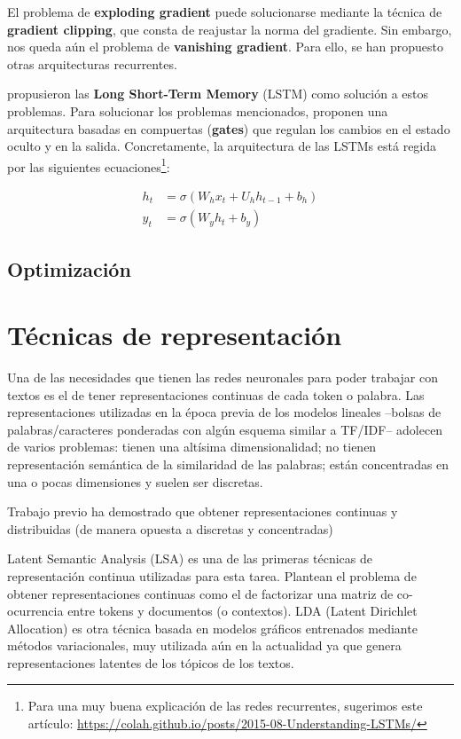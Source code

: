 El problema de \textbf{exploding gradient} puede solucionarse mediante la técnica de \textbf{gradient clipping}, que consta de reajustar la norma del gradiente. Sin embargo, nos queda aún el problema de \textbf{vanishing gradient}. Para ello, se han propuesto otras arquitecturas recurrentes.

\citet{hochreiter1997long} propusieron las \textbf{Long Short-Term Memory} (LSTM) como solución a estos problemas. Para solucionar los problemas mencionados, proponen una arquitectura basadas en compuertas (\textbf{gates}) que regulan los cambios en el estado oculto y en la salida. Concretamente, la arquitectura de las LSTMs está regida por las siguientes ecuaciones\footnote{Para una muy buena explicación de las redes recurrentes, sugerimos este artículo: \url{https://colah.github.io/posts/2015-08-Understanding-LSTMs/}}:


\begin{align}
    h_t &= \sigma(W_h x_t + U_h h_{t-1} + b_h) \\
    y_t &= \sigma(W_y h_t + b_y)
    \label{eq:lstm}
\end{align}



\subsection{Optimización}


\section{Técnicas de representación}

Una de las necesidades que tienen las redes neuronales para poder trabajar con textos es el de tener representaciones continuas de cada token o palabra. Las representaciones utilizadas en la época previa de los modelos lineales --bolsas de palabras/caracteres ponderadas con algún esquema similar a TF/IDF-- adolecen de varios problemas: tienen una altísima dimensionalidad; no tienen representación semántica de la similaridad de las palabras; están concentradas en una o pocas dimensiones y suelen ser discretas.

Trabajo previo ha demostrado que obtener representaciones continuas y distribuidas (de manera opuesta a discretas y concentradas)

Latent Semantic Analysis (LSA) \cite{landauer1997solution} es una de las primeras técnicas de representación continua utilizadas para esta tarea. Plantean el problema de obtener representaciones continuas como el de factorizar una matriz de co-ocurrencia entre tokens y documentos (o contextos). LDA (Latent Dirichlet Allocation) \cite{blei2003latent} es otra técnica basada en modelos gráficos entrenados mediante métodos variacionales, muy utilizada aún en la actualidad ya que genera representaciones latentes de los tópicos de los textos.

